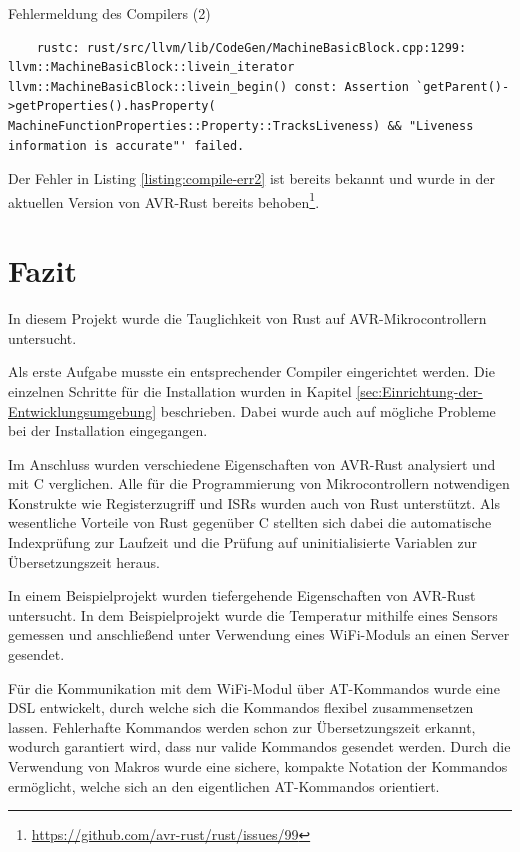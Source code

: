 \documentclass
[ 12pt,
  parskip=half %
]{scrreprt}
\newenvironment{mylisting}[1][H]
{\captionsetup{aboveskip=-0.2\normalbaselineskip}\begin{listing}[#1]}
{\end{listing}}
\begin{document}
\begin{mylisting}
	\caption{Fehlermeldung des Compilers (2)}
	\label{listing:compile-err2}
	\begin{verbatim}
	rustc: rust/src/llvm/lib/CodeGen/MachineBasicBlock.cpp:1299: llvm::MachineBasicBlock::livein_iterator llvm::MachineBasicBlock::livein_begin() const: Assertion `getParent()->getProperties().hasProperty( MachineFunctionProperties::Property::TracksLiveness) && "Liveness information is accurate"' failed.
	\end{verbatim}
\end{mylisting} 

Der Fehler in Listing \ref{listing:compile-err2} ist bereits bekannt und wurde in der aktuellen Version von AVR-Rust bereits behoben\footnote{ \url{https://github.com/avr-rust/rust/issues/99}}.

\chapter{Fazit}

In diesem Projekt wurde die Tauglichkeit von Rust auf AVR-Mikrocontrollern untersucht. 

Als erste Aufgabe musste ein entsprechender Compiler eingerichtet werden. Die einzelnen Schritte für die Installation wurden in Kapitel \ref{sec:Einrichtung-der-Entwicklungsumgebung} beschrieben. Dabei wurde auch auf mögliche Probleme bei der Installation eingegangen.

Im Anschluss wurden verschiedene Eigenschaften von AVR-Rust analysiert und mit C verglichen. Alle für die Programmierung von Mikrocontrollern notwendigen Konstrukte wie Registerzugriff und ISRs wurden auch von Rust unterstützt. Als wesentliche Vorteile von Rust gegenüber C stellten sich dabei die automatische Indexprüfung zur Laufzeit und die Prüfung auf uninitialisierte Variablen zur Übersetzungszeit heraus.  

In einem Beispielprojekt wurden tiefergehende Eigenschaften von AVR-Rust untersucht. In dem Beispielprojekt wurde die Temperatur mithilfe eines Sensors gemessen und anschließend unter Verwendung eines WiFi-Moduls an einen Server gesendet. 

Für die Kommunikation mit dem WiFi-Modul über AT-Kommandos wurde eine DSL entwickelt, durch welche sich die Kommandos flexibel zusammensetzen lassen. Fehlerhafte Kommandos werden schon zur Übersetzungszeit erkannt, wodurch garantiert wird, dass nur valide Kommandos gesendet werden. Durch die Verwendung von Makros wurde eine sichere, kompakte Notation der Kommandos ermöglicht, welche sich an den eigentlichen AT-Kommandos orientiert.
\end{document}
